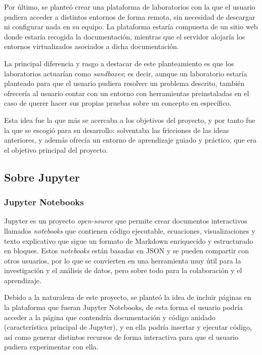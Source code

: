             Por último, se planteó crear una plataforma de laboratorios con la que el usuario pudiera acceder a distintos entornos de forma remota, sin necesidad de descargar ni configurar nada en su equipo. La plataforma estaría compuesta de un sitio web donde estaría recogida la documentación, mientras que el servidor alojaría los entornos virtualizados asociados a dicha documentación.
            
            La principal diferencia y rasgo a destacar de este planteamiento es que los laboratorios actuarían como \textit{sandboxes}; es decir, aunque un laboratorio estaría planteado para que el usuario pudiera resolver un problema descrito, también ofrecería al usuario contar con un entorno con herramientas preinstaladas en el caso de querer hacer sus propias pruebas sobre un concepto en específico.

            Esta idea fue la que más se acercaba a los objetivos del proyecto, y por tanto fue la que se escogió para su desarrollo: solventaba las fricciones de las ideas anteriores, y además ofrecía un entorno de aprendizaje guiado y práctico, que era el objetivo principal del proyecto.

            \newpage

        \subsection{Sobre Jupyter}

            \subsubsection{Jupyter Notebooks}
                
                Jupyter \cite{jupyter} es un proyecto \textit{open-source} que permite crear documentos interactivos llamados \textit{notebooks} que contienen código ejecutable, ecuaciones, visualizaciones y texto explicativo que sigue un formato de Markdown enriquecido y estructurado en bloques. Estos \textit{notebooks} están basadas en JSON y se pueden compartir con otros usuarios, por lo que se convierten en una herramienta muy útil para la investigación y el análisis de datos, pero sobre todo para la colaboración y el aprendizaje.
            
                Debido a la naturaleza de este proyecto, se planteó la idea de incluir páginas en la plataforma que fueran Jupyter Notebooks, de esta forma el usuario podría acceder a la página que contendría documentación y código anidado (característica principal de Jupyter), y en ella podría insertar y ejecutar código, así como generar distintos recursos de forma interactiva para que el usuario pudiera experimentar con ella.

